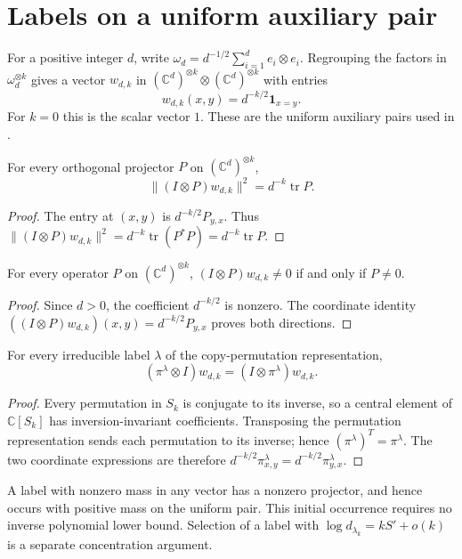 \section{Labels on a uniform auxiliary pair}
\label{sec:uniform_bell_label}

For a positive integer $d$, write
$\omega_d=d^{-1/2}\sum_{i=1}^d e_i\otimes e_i$. Regrouping the factors in
$\omega_d^{\otimes k}$ gives a vector $w_{d,k}$ in
$(\mathbb C^d)^{\otimes k}\otimes(\mathbb C^d)^{\otimes k}$ with entries
\[
 w_{d,k}(x,y)=d^{-k/2}\mathbf 1_{x=y}.
\]
For $k=0$ this is the scalar vector $1$. These are the uniform auxiliary
pairs used in \cite[Section~7]{OpenAI2026AreaLaw}.

\begin{theorem}
\label{thm:uniform_bell_projection_mass}
\leanok
For every orthogonal projector $P$ on $(\mathbb C^d)^{\otimes k}$,
\[
 \|(I\otimes P)w_{d,k}\|^2=d^{-k}\operatorname{tr}P.
\]
\end{theorem}
\begin{proof}\leanok
The entry at $(x,y)$ is $d^{-k/2}P_{y,x}$. Thus
$\|(I\otimes P)w_{d,k}\|^2=d^{-k}\operatorname{tr}(P^*P)
=d^{-k}\operatorname{tr}P$.
\end{proof}

\begin{theorem}
\label{thm:uniform_bell_projection_nonzero}
\leanok
For every operator $P$ on $(\mathbb C^d)^{\otimes k}$,
$(I\otimes P)w_{d,k}\ne0$ if and only if $P\ne0$.
\end{theorem}
\begin{proof}\leanok
Since $d>0$, the coefficient $d^{-k/2}$ is nonzero. The coordinate identity
$((I\otimes P)w_{d,k})(x,y)=d^{-k/2}P_{y,x}$ proves both directions.
\end{proof}

\begin{theorem}
\label{thm:uniform_bell_matching_labels}
\leanok
For every irreducible label $\lambda$ of the copy-permutation representation,
\[
 (\pi^\lambda\otimes I)w_{d,k}
 =(I\otimes\pi^\lambda)w_{d,k}.
\]
\end{theorem}
\begin{proof}\leanok
Every permutation in $S_k$ is conjugate to its inverse, so a central element
of $\mathbb C[S_k]$ has inversion-invariant coefficients. Transposing the
permutation representation sends each permutation to its inverse; hence
$(\pi^\lambda)^T=\pi^\lambda$. The two coordinate expressions are therefore
$d^{-k/2}\pi^\lambda_{x,y}=d^{-k/2}\pi^\lambda_{y,x}$.
\end{proof}

A label with nonzero mass in any vector has a nonzero projector, and hence
occurs with positive mass on the uniform pair. This initial occurrence
requires no inverse polynomial lower bound. Selection of a label with
$\log d_{\lambda_k}=kS'+o(k)$ is a separate concentration argument.
